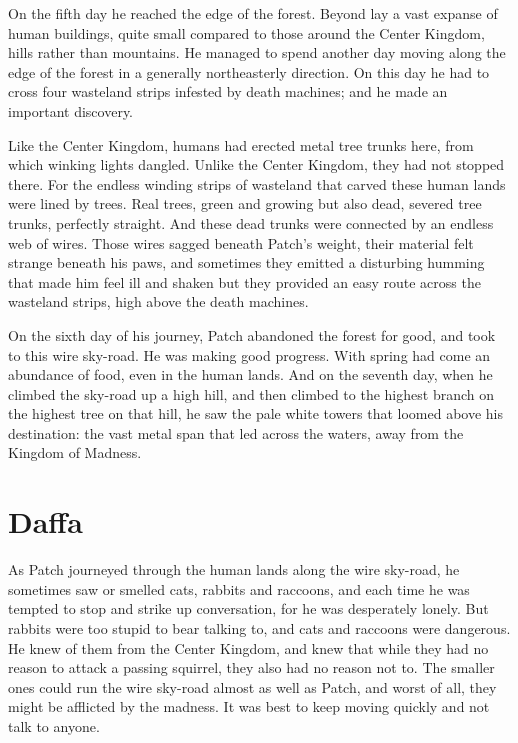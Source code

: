 \documentclass[12pt]{book}
\begin{document}
On the fifth day he reached the edge of the forest. Beyond lay a vast expanse of human buildings, quite small compared to those around the Center Kingdom, hills rather than mountains. He managed to spend another day moving along the edge of the forest in a generally northeasterly direction. On this day he had to cross four wasteland strips infested by death machines; and he made an important discovery.

Like the Center Kingdom, humans had erected metal tree trunks here, from which winking lights dangled. Unlike the Center Kingdom, they had not stopped there. For the endless winding strips of wasteland that carved these human lands were lined by trees. Real trees, green and growing %
but also dead, severed tree trunks, perfectly straight. And these dead trunks were connected by an endless web of wires. Those wires sagged beneath Patch's weight, their material felt strange beneath his paws, and sometimes they emitted a disturbing humming that made him feel ill and shaken %
but they provided an easy route across the wasteland strips, high above the death machines.

On the sixth day of his journey, Patch abandoned the forest for good, and took to this wire sky-road. He was making good progress. With spring had come an abundance of food, even in the human lands. And on the seventh day, when he climbed the sky-road up a high hill, and then climbed to the highest branch on the highest tree on that hill, he saw the pale white towers that loomed above his destination: the vast metal span that led across the waters, away from the Kingdom of Madness.


\section{Daffa}

As Patch journeyed through the human lands along the wire sky-road, he sometimes saw or smelled cats, rabbits and raccoons, and each time he was tempted to stop and strike up conversation, for he was desperately lonely. But rabbits were too stupid to bear talking to, and cats and raccoons were dangerous. He knew of them from the Center Kingdom, and knew that while they had no reason to attack a passing squirrel, they also had no reason not to. The smaller ones could run the wire sky-road almost as well as Patch, and worst of all, they might be afflicted by the madness. It was best to keep moving quickly and not talk to anyone.
\end{document}
